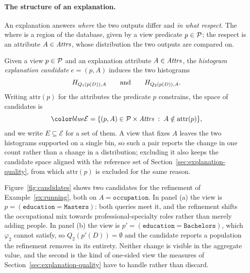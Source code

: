 \paragraph{The structure of an explanation.}
An explanation answers \emph{where} the two outputs differ and \emph{in what respect}.
The where is a region of the database, given by a view predicate $p\in\mathcal{P}$; the respect is an attribute $A\in\mathit{Attrs}$, whose distribution the two outputs are compared on.

\begin{definition}
\label{def:candidate}
Given a view $p\in\mathcal{P}$ and an explanation attribute $A\in\mathit{Attrs}$, the \emph{histogram explanation candidate} $e=(p,A)$ induces the two histograms
\[
    H_{Q_1(p(D)),A}
    \qquad\text{and}\qquad
    H_{Q_2(p(D)),A}.
\]
Writing $\mathrm{attr}(p)$ for the attributes the predicate $p$ constrains, the space of candidates is
\[
\added{\mathcal{E}}=\{(p,A)\in\views\times\Attrs \;:\; A\notin\mathrm{attr}(p)\},
\]
and we write $E\subseteq\mathcal{E}$ for a set of them.
A view that fixes $A$ leaves the two histograms supported on a single bin, so such a pair reports the change in one count rather than a change in a distribution; excluding it also keeps the candidate space aligned with the reference set of Section~\ref{sec:explanation-quality}, from which $\mathrm{attr}(p)$ is excluded for the same reason.
\end{definition}

\begin{example}
\label{ex:candidate}
Figure~\ref{fig:candidates} shows two candidates for the refinement of Example~\ref{ex:running}, both on $A=\texttt{occupation}$.
In panel (a) the view is $p=(\texttt{education}=\texttt{Masters})$: both queries meet it, and the refinement shifts the occupational mix towards professional-specialty roles rather than merely adding people.
In panel (b) the view is $p'=(\texttt{education}=\texttt{Bachelors})$, which $\varphi_2$ cannot satisfy, so $Q_2(p'(D))=\emptyset$ and the candidate reports a population the refinement removes in its entirety.
Neither change is visible in the aggregate value, and the second is the kind of one-sided view the measures of Section~\ref{sec:explanation-quality} have to handle rather than discard.
\end{example}

